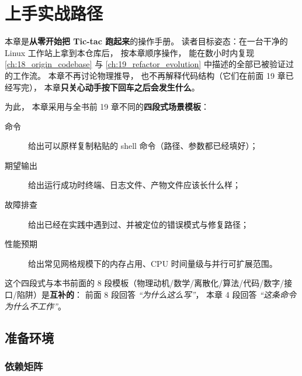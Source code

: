 %

\chapter{上手实战路径}
\label{ch:20_hands_on}

本章是\textbf{从零开始把 Tic-tac 跑起来}的操作手册。
读者目标姿态：在一台干净的 Linux 工作站上拿到本仓库后，
按本章顺序操作，
能在数小时内复现 \cref{ch:18_origin_codebase} 与 \cref{ch:19_refactor_evolution} 中描述的全部已被验证过的工作流。
本章不再讨论物理推导，
也不再解释代码结构（它们在前面 19 章已经写完），
本章\textbf{只关心动手按下回车之后会发生什么}。

为此，
本章采用与全书前 19 章不同的\textbf{四段式场景模板}：
\begin{description}
  \item[命令] 给出可以原样复制粘贴的 shell 命令（路径、参数都已经填好）；
  \item[期望输出] 给出运行成功时终端、日志文件、产物文件应该长什么样；
  \item[故障排查] 给出已经在实践中遇到过、并被定位的错误模式与修复路径；
  \item[性能预期] 给出常见网格规模下的内存占用、CPU 时间量级与并行可扩展范围。
\end{description}
这个四段式与本书前面的 8 段模板（物理动机/数学/离散化/算法/代码/数字/接口/陷阱）是\textbf{互补的}：
前面 8 段回答 \emph{“为什么这么写”}，
本章 4 段回答 \emph{“这条命令为什么不工作”}。

\section{准备环境}
\label{sec:ch20-env}

\subsection{依赖矩阵}
\label{sec:ch20-env-deps}

